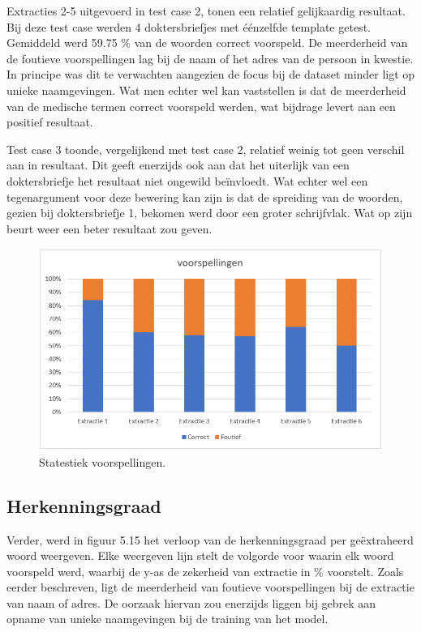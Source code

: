 Extracties 2-5 uitgevoerd in test case 2, tonen een relatief gelijkaardig resultaat. Bij deze test case werden 4 doktersbriefjes met éénzelfde template getest. Gemiddeld werd 59.75 \% van de woorden correct voorspeld. De meerderheid van de foutieve voorspellingen lag bij de naam of het adres van de persoon in kwestie. In principe was dit te verwachten aangezien de focus bij de dataset minder ligt op unieke naamgevingen. Wat men echter wel kan vaststellen is dat de meerderheid van de medische termen correct voorspeld werden, wat bijdrage levert aan een positief resultaat. 



Test case 3 toonde, vergelijkend met test case 2, relatief weinig tot geen verschil aan in resultaat. Dit geeft enerzijds ook aan dat het uiterlijk van een doktersbriefje het resultaat niet ongewild beïnvloedt. Wat echter wel een tegenargument voor deze bewering kan zijn is dat de spreiding van de woorden, gezien bij doktersbriefje 1, bekomen werd door een groter schrijfvlak. Wat op zijn beurt weer een beter resultaat zou geven. 




 

\begin{figure}[h]
	
	\includegraphics[width=\textwidth,height=\textheight,keepaspectratio]{../Foto's/voorspellingen_statistiek.png}
		\captionsetup{justification=centering,margin=2cm}
	\caption{Statestiek voorspellingen.}
	\centering
\end{figure}
 \clearpage
\subsection{Herkenningsgraad}
Verder, werd in figuur 5.15 het verloop van de herkenningsgraad per geëxtraheerd woord weergeven. Elke weergeven lijn stelt de volgorde voor waarin elk woord voorspeld werd, waarbij de y-as de zekerheid van extractie in \% voorstelt. Zoals eerder beschreven, ligt de meerderheid van foutieve voorspellingen bij de extractie van naam of adres. De oorzaak hiervan zou enerzijds liggen bij gebrek aan opname van unieke naamgevingen bij de training van het model. 


